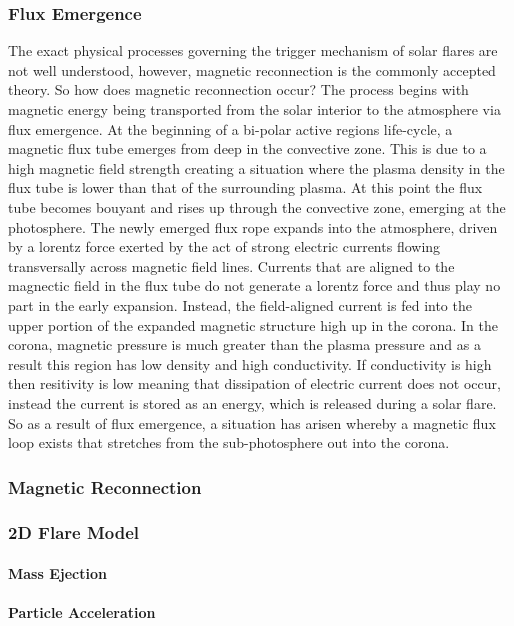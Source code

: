 \subsubsection{Flux Emergence}
The exact physical processes governing the trigger mechanism of solar flares are not well understood, however, magnetic reconnection is the commonly accepted theory. So how does magnetic reconnection occur? The process begins with magnetic energy being transported from the solar interior to the atmosphere via flux emergence. At the beginning of a bi-polar active regions life-cycle, a magnetic flux tube emerges from deep in the convective zone. This is due to a high magnetic field strength creating a situation where the plasma density in the flux tube is lower than that of the surrounding plasma. At this point the flux tube becomes bouyant and rises up through the convective zone, emerging at the photosphere. The newly emerged flux rope expands into the atmosphere, driven by a lorentz force exerted by the act of strong electric currents flowing transversally across magnetic field lines. Currents that are aligned to the magnectic field in the flux tube do not generate a lorentz force and thus play no part in the early expansion. Instead, the field-aligned current is fed into the upper portion of the expanded magnetic structure high up in the corona. In the corona, magnetic pressure is much greater than the plasma pressure and as a result this region has low density and high conductivity. If conductivity is high then resitivity is low meaning that dissipation of electric current does not occur, instead the current is stored as an energy, which is released during a solar flare. So as a result of flux emergence, a situation has arisen whereby a magnetic flux loop exists that stretches from the sub-photosphere out into the corona. 

\subsubsection{Magnetic Reconnection}



\subsubsection{2D Flare Model}

\paragraph{Mass Ejection}
\paragraph{Particle Acceleration}
